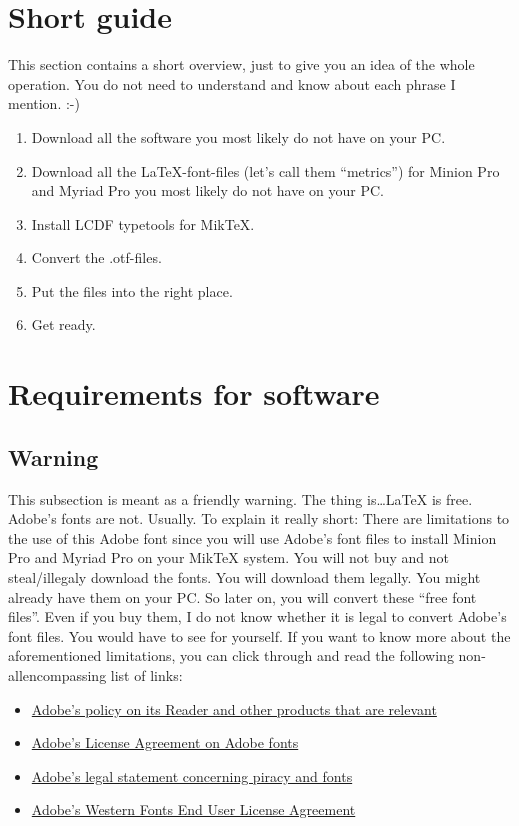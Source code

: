 %

\section{Short guide}

This section contains a short overview, just to give you an idea of the whole operation. You do not need to understand and know about each phrase I mention. :-)

\begin{enumerate}\setlength{\itemsep}{-2pt}
	\item Download all the software you most likely do not have on your PC.
	\item Download all the \LaTeX{}-font-files (let's call them ``metrics'') for Minion Pro and Myriad Pro you most likely do not have on your PC.
	\item Install LCDF typetools for MikTeX.
	\item Convert the .otf-files.
	\item Put the files into the right place.
	\item Get ready.
\end{enumerate}

\section{Requirements for software}

\subsection{Warning}

This subsection is meant as a friendly warning. The thing is\ldots \LaTeX{} is free. Adobe's fonts are not. Usually. To explain it really short: There are limitations to the use of this Adobe font since you will use Adobe's font files to install Minion Pro and Myriad Pro on your MikTeX system. You will not buy and not steal/illegaly download the fonts. You will download them legally. You might already have them on your PC. So later on, you will convert these ``free font files''. Even if you buy them, I do not know whether it is legal to convert Adobe's font files. You would have to see for yourself. If you want to know more about the aforementioned limitations, you can click through and read the following non-allencompassing list of links:
\begin{itemize}\setlength{\itemsep}{-2pt}
	\item \href{http://www.adobe.com/products/eulas/}{Adobe's policy on its Reader and other products that are relevant}
	\item \href{http://www.adobe.com/type/browser/legal/index.html}{Adobe's License Agreement on Adobe fonts}
	\item \href{http://www.adobe.com/aboutadobe/antipiracy/fonts.html}{Adobe's legal statement concerning piracy and fonts}
	\item \href{http://www.adobe.com/type/browser/legal/index.html}{Adobe's Western Fonts End User License Agreement}
\end{itemize}

